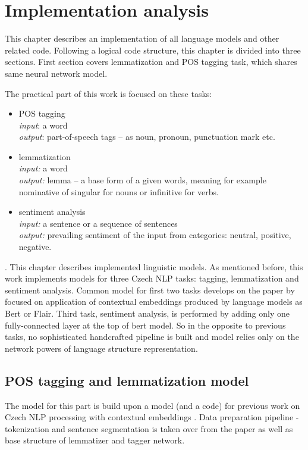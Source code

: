 \chapter{Implementation analysis}
This chapter describes an implementation of all language models and other related code. Following a logical code structure, this chapter is divided into three sections. First section covers lemmatization and POS tagging task, which shares same neural network model.


The practical part of this work is focused on these tasks:
\begin{itemize}
\item POS tagging \\
\textit{input}: a word \\
\textit{output}: part-of-speech tags -- as noun, pronoun, punctuation mark etc.
\item lemmatization \\
\textit{input:} a word \\
\textit{output:} lemma -- a base form of a given words, meaning for example nominative of singular for nouns or infinitive for verbs. 
\item sentiment analysis \\
\textit{input:} a sentence or a sequence of sentences \\
\textit{output:} prevailing sentiment of the input from categories: neutral, positive, negative.
\end{itemize}.
\label{chap:impl}
This chapter describes implemented linguistic models. As mentioned before, this work implements models for three Czech NLP tasks: tagging, lemmatization and sentiment analysis. Common model for first two tasks develops on the paper by \cite[]{straka2019czech} focused on application of contextual embeddings produced by language models as Bert %
 or Flair. %
 Third task, sentiment analysis, is performed by adding only one fully-connected layer at the top of bert model. So in the opposite to previous tasks, no sophisticated handcrafted pipeline is built and model relies only on the network powers of language structure representation.
 \section{POS tagging and lemmatization model}
The model for this part is build upon a model (and a code) for previous work on Czech NLP processing with contextual embeddings \cite[]{straka2019czech}. Data preparation %
pipeline - tokenization and sentence segmentation is taken over from the paper as well as base structure of lemmatizer and tagger network. 


